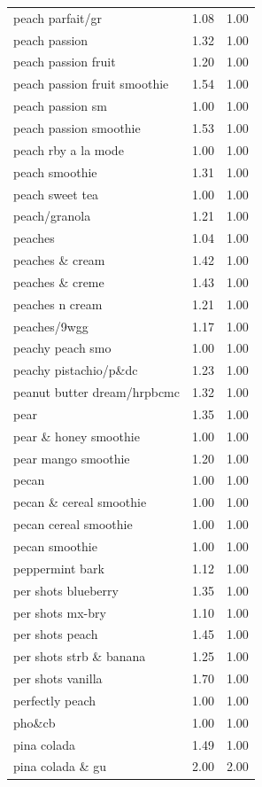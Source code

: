 \begin{table}
\begin{tabular}{lrr}
peach parfait/gr & 1.08 & 1.00 \\
peach passion & 1.32 & 1.00 \\
peach passion fruit & 1.20 & 1.00 \\
peach passion fruit smoothie & 1.54 & 1.00 \\
peach passion sm & 1.00 & 1.00 \\
peach passion smoothie & 1.53 & 1.00 \\
peach rby a la mode & 1.00 & 1.00 \\
peach smoothie & 1.31 & 1.00 \\
peach sweet tea & 1.00 & 1.00 \\
peach/granola & 1.21 & 1.00 \\
peaches & 1.04 & 1.00 \\
peaches \& cream & 1.42 & 1.00 \\
peaches \& creme & 1.43 & 1.00 \\
peaches n cream & 1.21 & 1.00 \\
peaches/9wgg & 1.17 & 1.00 \\
peachy peach smo & 1.00 & 1.00 \\
peachy pistachio/p\&dc & 1.23 & 1.00 \\
peanut butter dream/hrpbcmc & 1.32 & 1.00 \\
pear & 1.35 & 1.00 \\
pear \& honey smoothie & 1.00 & 1.00 \\
pear mango smoothie & 1.20 & 1.00 \\
pecan & 1.00 & 1.00 \\
pecan \& cereal smoothie & 1.00 & 1.00 \\
pecan cereal smoothie & 1.00 & 1.00 \\
pecan smoothie & 1.00 & 1.00 \\
peppermint bark & 1.12 & 1.00 \\
per shots blueberry & 1.35 & 1.00 \\
per shots mx-bry & 1.10 & 1.00 \\
per shots peach & 1.45 & 1.00 \\
per shots strb \& banana & 1.25 & 1.00 \\
per shots vanilla & 1.70 & 1.00 \\
perfectly peach & 1.00 & 1.00 \\
pho\&cb & 1.00 & 1.00 \\
pina colada & 1.49 & 1.00 \\
pina colada \& gu & 2.00 & 2.00 \\

\end{tabular}
\end{table}
